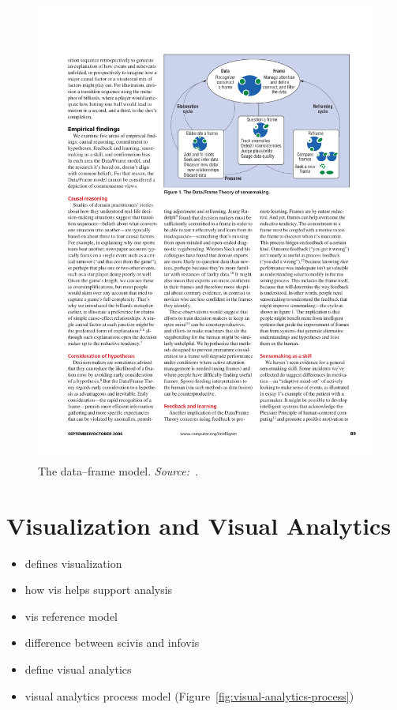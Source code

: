 \begin{figure}[!htb]
	\centering
	\includegraphics[width=.8\columnwidth]{data-frame-model}
	\caption{The data--frame model. \emph{Source:~\cite{Klein2003}}.}
	\label{fig:data-frame-model}
\end{figure}

\section{Visualization and Visual Analytics}
\begin{itemize}
	\item defines visualization~\cite{Munzner2014}
	\item how vis helps support analysis~\cite{Card1999}
	\item vis reference model~\cite{Card1999}
	\item difference between scivis and infovis
	\item define visual analytics~\cite{Thomas2005, Keim2010}
	\item visual analytics process model (Figure~\ref{fig:visual-analytics-process})
\end{itemize}

